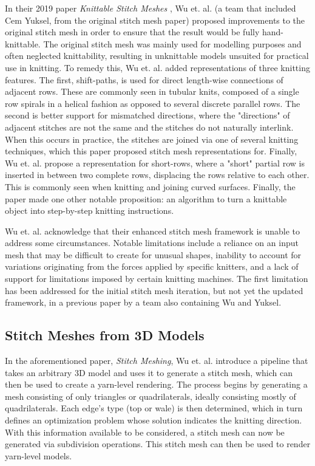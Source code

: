 \documentclass{IEEEcsmag}
\begin{document}
In their 2019 paper \textit{Knittable Stitch Meshes} \cite{knittable}, Wu et.
al. (a team that included Cem Yuksel, from the original stitch mesh paper)
proposed improvements to the original stitch mesh in order to ensure that the
result would be fully hand-knittable. The original stitch mesh was mainly used
for modelling purposes and often neglected knittability, resulting in
unknittable models unsuited for practical use in knitting. To remedy this, Wu
et. al. added representations of three knitting features. The first,
shift-paths, is used for direct length-wise connections of adjacent rows. These
are commonly seen in tubular knits, composed of a single row spirals in a
helical fashion as opposed to several discrete parallel rows. The second is
better support for mismatched directions, where the "directions" of adjacent
stitches are not the same and the stitches do not naturally interlink. When
this occurs in practice, the stitches are joined via one of several knitting
techniques, which this paper proposed stitch mesh representations for. Finally,
Wu et. al. propose a representation for short-rows, where a "short" partial row
is inserted in between two complete rows, displacing the rows relative to each
other. This is commonly seen when knitting and joining curved surfaces.
Finally, the paper made one other notable proposition: an algorithm to turn a
knittable object into step-by-step knitting instructions.

Wu et. al. acknowledge that their enhanced stitch mesh framework is unable to
address some circumstances. Notable limitations include a reliance on an input
mesh that may be difficult to create for unusual shapes, inability to account
for variations originating from the forces applied by specific knitters, and a
lack of support for limitations imposed by certain knitting machines. The first
limitation has been addressed for the initial stitch mesh iteration, but not
yet the updated framework, in a previous paper by a team also containing Wu and
Yuksel.

\subsection{Stitch Meshes from 3D Models}

In the aforementioned paper, \textit{Stitch Meshing}, Wu et. al. introduce a
pipeline that takes an arbitrary 3D model and uses it to generate a stitch
mesh, which can then be used to create a yarn-level rendering. The process
begins by generating a mesh consisting of only triangles or quadrilaterals,
ideally consisting mostly of quadrilaterals. Each edge's type (top or wale) is
then determined, which in turn defines an optimization problem whose solution
indicates the knitting direction. With this information available to be
considered, a stitch mesh can now be generated via subdivision operations. This
stitch mesh can then be used to render yarn-level models.
\end{document}
